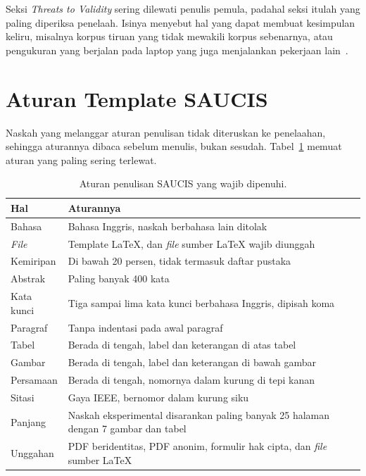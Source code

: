 Seksi \textit{Threats to Validity} sering dilewati penulis pemula, padahal
seksi itulah yang paling diperiksa penelaah. Isinya menyebut hal yang dapat
membuat kesimpulan keliru, misalnya korpus tiruan yang tidak mewakili korpus
sebenarnya, atau pengukuran yang berjalan pada laptop yang juga menjalankan
pekerjaan lain~\cite{runeson2009case}.

\section{Aturan Template SAUCIS}

Naskah yang melanggar aturan penulisan tidak diteruskan ke penelaahan, sehingga
aturannya dibaca sebelum menulis, bukan sesudah.
Tabel~\ref{tab:aturan-saucis} memuat aturan yang paling sering terlewat.

\begin{table}[htbp]
  \centering
  \caption{Aturan penulisan SAUCIS yang wajib dipenuhi.}
  \label{tab:aturan-saucis}
  \begin{tabularx}{\textwidth}{|l|X|}
    \hline
    \textbf{Hal} & \textbf{Aturannya} \\
    \hline
    Bahasa & Bahasa Inggris, naskah berbahasa lain ditolak \\
    \hline
    \textit{File} & Template LaTeX, dan \textit{file} sumber LaTeX wajib diunggah \\
    \hline
    Kemiripan & Di bawah 20 persen, tidak termasuk daftar pustaka \\
    \hline
    Abstrak & Paling banyak 400 kata \\
    \hline
    Kata kunci & Tiga sampai lima kata kunci berbahasa Inggris, dipisah koma \\
    \hline
    Paragraf & Tanpa indentasi pada awal paragraf \\
    \hline
    Tabel & Berada di tengah, label dan keterangan di atas tabel \\
    \hline
    Gambar & Berada di tengah, label dan keterangan di bawah gambar \\
    \hline
    Persamaan & Berada di tengah, nomornya dalam kurung di tepi kanan \\
    \hline
    Sitasi & Gaya IEEE, bernomor dalam kurung siku \\
    \hline
    Panjang & Naskah eksperimental disarankan paling banyak 25 halaman dengan 7 gambar dan tabel \\
    \hline
    Unggahan & PDF beridentitas, PDF anonim, formulir hak cipta, dan \textit{file} sumber LaTeX \\
    \hline
  \end{tabularx}
\end{table}

